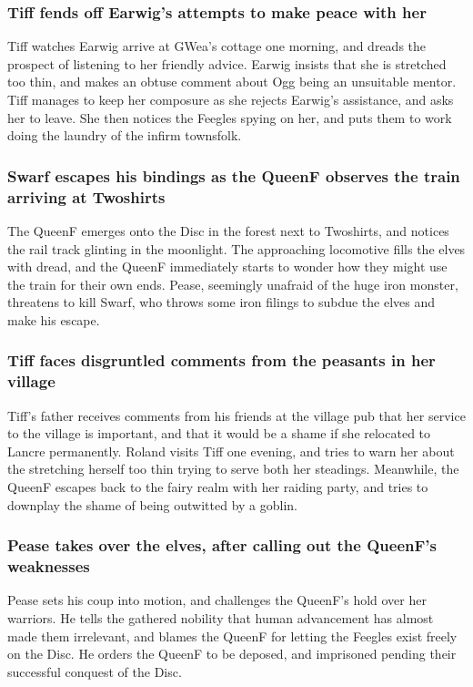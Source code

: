 \subsubsection{\Gls{Tiff} fends off \Gls{Earwig}'s attempts to make peace with her}
\Gls{Tiff} watches \Gls{Earwig} arrive at \Gls{GWea}'s cottage one morning, and dreads the prospect
of listening to her friendly advice. \Gls{Earwig} insists that she is stretched too thin, and makes
an obtuse comment about \Gls{Ogg} being an unsuitable mentor. \Gls{Tiff} manages to keep her
composure as she rejects \Gls{Earwig}'s assistance, and asks her to leave. She then notices the
Feegles spying on her, and puts them to work doing the laundry of the infirm townsfolk.

\subsubsection{\Gls{Swarf} escapes his bindings as the \Gls{QueenF} observes the train arriving
    at Twoshirts}
The \Gls{QueenF} emerges onto the Disc in the forest next to Twoshirts, and notices the rail track
glinting in the moonlight. The approaching locomotive fills the elves with dread, and the
\Gls{QueenF} immediately starts to wonder how they might use the train for their own ends.
\Gls{Pease}, seemingly unafraid of the huge iron monster, threatens to kill \Gls{Swarf}, who throws
some iron filings to subdue the elves and make his escape.

\subsubsection{\Gls{Tiff} faces disgruntled comments from the peasants in her village}
\Gls{Tiff}'s father receives comments from his friends at the village pub that her service to the
village is important, and that it would be a shame if she relocated to Lancre permanently.
\Gls{Roland} visits \Gls{Tiff} one evening, and tries to warn her about the stretching herself too
thin trying to serve both her steadings. Meanwhile, the \Gls{QueenF} escapes back to the fairy
realm with her raiding party, and tries to downplay the shame of being outwitted by a goblin.

\subsubsection{\Gls{Pease} takes over the elves, after calling out the \Gls{QueenF}'s weaknesses}
\Gls{Pease} sets his coup into motion, and challenges the \Gls{QueenF}'s hold over her warriors. He
tells the gathered nobility that human advancement has almost made them irrelevant, and blames the
\Gls{QueenF} for letting the Feegles exist freely on the Disc. He orders the \Gls{QueenF} to be
deposed, and imprisoned pending their successful conquest of the Disc.

